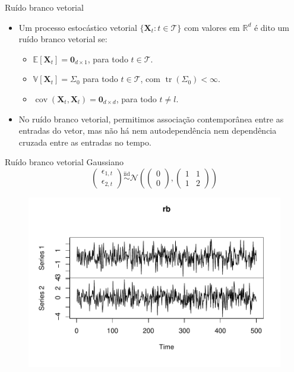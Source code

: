 \documentclass[11pt]{beamer}
\begin{document}
\begin{frame}{Ruído branco vetorial}
	\begin{itemize}
		\item Um processo estocástico vetorial  $\{\boldsymbol{X}_t: t \in \mathcal{T}\}$ com valores em $\mathbb{R}^d$ é dito um ruído branco vetorial se:
		
		\begin{itemize}
			\item $\mathbb{E}[\boldsymbol{X}_t] = \boldsymbol{0}_{d\times 1}$, para todo $t \in \mathcal{T}$.
		\item $ \mathbb{V}[\boldsymbol{X}_t] = \Sigma_0$ para todo $t \in \mathcal{T}$, com $\operatorname{tr}(\Sigma_0) < \infty$.
\item $\operatorname{cov}(\boldsymbol{X}_t,\boldsymbol{X}_{l}) = \boldsymbol{0}_{d\times d}$, para todo $t \neq l$.
		\end{itemize}
		\item No ruído branco vetorial, permitimos associação contemporânea entre as entradas do vetor, mas não há nem autodependência nem dependência cruzada entre as entradas no tempo.
	\end{itemize}
\end{frame}

\begin{frame}{Ruído branco vetorial Gaussiano}
$$\begin{pmatrix}
	{\epsilon_{1,t}} \\
		{\epsilon_{2,t}}
\end{pmatrix} \overset{\text{iid}}{\sim} \mathcal{N}\left(\begin{pmatrix}
0 \\
 0
\end{pmatrix} , \begin{pmatrix}
1 & 1 \\
1 & 2
\end{pmatrix}\right)$$
\begin{figure}
	\centering
\includegraphics[scale=0.7]{graficos/rb_multi.pdf}
\end{figure}

\end{frame}
\end{document}
